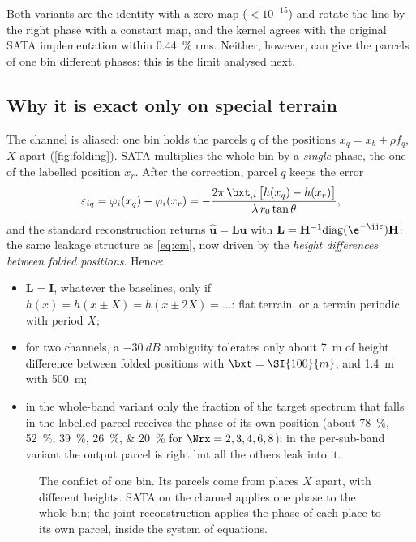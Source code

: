 Both variants are the identity with a zero map ($<10^{-15}$) and rotate the line by the right phase with a constant map, and
the kernel agrees with the original SATA implementation within \SI{0.44}{\percent} rms. Neither, however, can give the
parcels of one bin different phases: this is the limit analysed next.

\subsection{Why it is exact only on special terrain}\label{sec:sata-limit}

The channel is aliased: one bin holds the parcels $q$ of the positions $x_q=x_b+\rho f_q$, $X$ apart
(\cref{fig:folding}). SATA multiplies the whole bin by a \emph{single} phase, the one of the labelled position $x_r$. After
the correction, parcel $q$ keeps the error
\begin{equation}
  \varepsilon_{iq} = \varphi_i(x_q)-\varphi_i(x_r)
  = -\frac{2\pi\,\bxt_{,i}\,\bigl[h(x_q)-h(x_r)\bigr]}{\lambda\, r_0\tan\theta},
\end{equation}
and the standard reconstruction returns $\hat{\bm u}=\mathbf L\bm u$ with $\mathbf L=\mathbf H^{-1}\mathrm{diag}(\e^{-\jj\varepsilon})\mathbf H$:
the same leakage structure as \eqref{eq:cm}, now driven by the \emph{height differences between folded positions}. Hence:
\begin{itemize}
  \item $\mathbf L=\mathbf I$, whatever the baselines, only if $h(x)=h(x\pm X)=h(x\pm2X)=\dots$: flat terrain, or a terrain
        periodic with period $X$;
  \item for two channels, a $\SI{-30}{dB}$ ambiguity tolerates only about \SI{7}{m} of height difference between folded
        positions with $\bxt=\SI{100}{m}$, and \SI{1.4}{m} with \SI{500}{m};
  \item in the whole-band variant only the fraction of the target spectrum that falls in the labelled parcel receives the
        phase of its own position (about \SIlist{78;52;39;26;20}{\percent} for $\Nrx=2,3,4,6,8$); in the per-sub-band
        variant the output parcel is right but all the others leak into it.
\end{itemize}
\begin{figure}[htbp]
\centering

\caption[The conflict of one bin]{The conflict of one bin. Its parcels come from places $X$ apart, with different heights.
SATA on the channel applies one phase to the whole bin; the joint reconstruction applies the phase of each place to its own
parcel, inside the system of equations.}
\label{fig:binconflict}
\end{figure}

